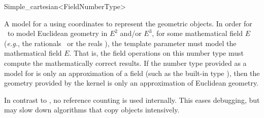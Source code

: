 \begin{ccRefClass}{Simple_cartesian<FieldNumberType>}


\ccDefinition
A model for a  using  coordinates to represent the
geometric objects. In order for \ccRefName\ to model Euclidean geometry
in $E^2$ and/or $E^3$, for some mathematical field $E$ (\textit{e.g.},
the rationals \Q\ or the reals \R), the template parameter       
must model the mathematical field $E$.  That is, the field operations on this
number type must compute the mathematically correct results.  If the number
type provided as a model for  is only an approximation of a
field (such as the built-in type ), then the geometry provided by
the kernel is only an approximation of Euclidean geometry.  


\ccIsModel
{}

\ccTypes
{}
\ccGlue
{}

\ccImplementation In contrast to , no reference counting
is used internally. This eases debugging, but may slow down algorithms
that copy objects intensively.

\ccSeeAlso
{} \\
 \\
 \\

\end{ccRefClass}
